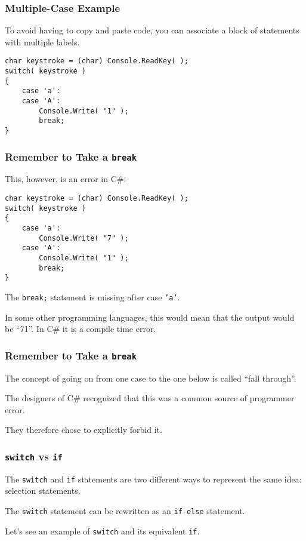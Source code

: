 \begin{frame}[fragile]
\frametitle{Multiple-Case Example}

To avoid having to copy and paste code, you can associate a block of statements with multiple labels.

\begin{verbatim}
char keystroke = (char) Console.ReadKey( );
switch( keystroke )
{
    case 'a':
    case 'A':
        Console.Write( "1" );
        break;
}
\end{verbatim}
\end{frame}

\begin{frame}[fragile]
\frametitle{Remember to Take a \texttt{break}}

This, however, is an error in C\#:

\begin{verbatim}
char keystroke = (char) Console.ReadKey( );
switch( keystroke )
{
    case 'a':
        Console.Write( "7" );
    case 'A':
        Console.Write( "1" );
        break;
}
\end{verbatim}

The \texttt{break;} statement is missing after case \texttt{'a'}.

In some other programming languages, this would mean that the output would be ``71''. In C\# it is a compile time error.

\end{frame}

\begin{frame}[fragile]
\frametitle{Remember to Take a \texttt{break}}

The concept of going on from one case to the one below is called ``fall through''.

The designers of C\# recognized that this was a common source of programmer error.

They therefore chose to explicitly forbid it.

\end{frame}

\begin{frame}
\frametitle{\texttt{switch} vs \texttt{if}}
The \texttt{switch} and \texttt{if} statements are two different ways to represent the same idea: selection statements.

The \texttt{switch} statement can be rewritten as an \texttt{if-else} statement.

Let's see an example of \texttt{switch} and its equivalent \texttt{if}.


\end{frame}


